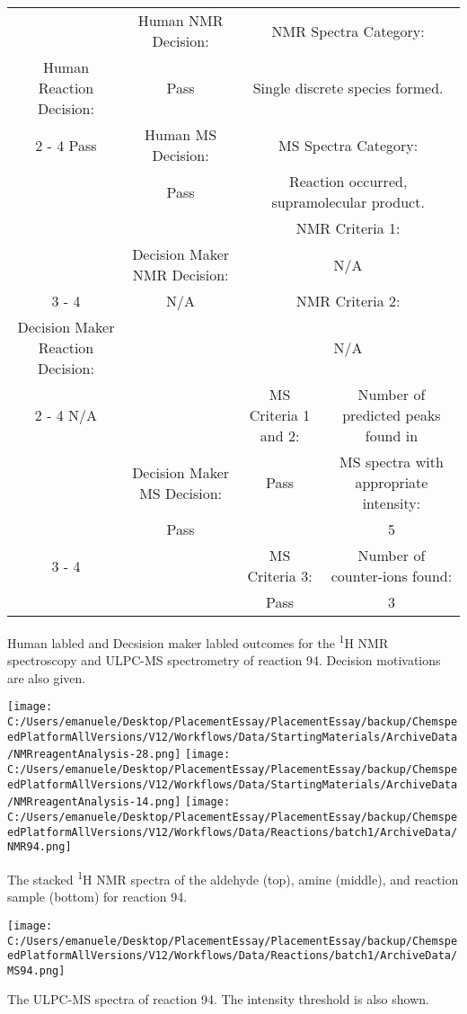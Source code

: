 \documentclass{article}%
\begin{document}
\begin{Decision Table}[H]%
\begin{tabular}{|c|c|c|c|}%
\hline%
&Human NMR Decision:&\multicolumn{2}{|c|}{NMR Spectra Category:}\\%
Human Reaction Decision:&Pass&\multicolumn{2}{|c|}{Single discrete species formed.}\\%
\cline{2%
-%
4}%
Pass&Human MS Decision:&\multicolumn{2}{|c|}{MS Spectra Category:}\\%
&Pass&\multicolumn{2}{|c|}{Reaction occurred, supramolecular product.}\\%
\hline%
&&\multicolumn{2}{|c|}{NMR Criteria 1:}\\%
&Decision Maker NMR Decision:&\multicolumn{2}{|c|}{N/A}\\%
\cline{3%
-%
4}%
&N/A&\multicolumn{2}{|c|}{NMR Criteria 2:}\\%
Decision Maker Reaction Decision:&&\multicolumn{2}{|c|}{N/A}\\%
\cline{2%
-%
4}%
N/A&&MS Criteria 1 and 2:&Number of predicted peaks found in\\%
&Decision Maker MS Decision:&Pass&MS spectra with appropriate intensity:\\%
&Pass&&5\\%
\cline{3%
-%
4}%
&&MS Criteria 3:&Number of counter{-}ions found:\\%
&&Pass&3\\%
\hline%
\end{tabular}%
\caption{Human labled and Decsision maker labled outcomes for the \textsuperscript{1}H NMR spectroscopy and ULPC-MS spectrometry of reaction 94. Decision motivations are also given.}%
\end{Decision Table}%
\begin{NMR Spectra}[H]%
\begin{center}%
\texttt{[image: C:/Users/emanuele/Desktop/PlacementEssay/PlacementEssay/backup/ChemspeedPlatformAllVersions/V12/Workflows/Data/StartingMaterials/ArchiveData/NMRreagentAnalysis-28.png]}\hfill%
\texttt{[image: C:/Users/emanuele/Desktop/PlacementEssay/PlacementEssay/backup/ChemspeedPlatformAllVersions/V12/Workflows/Data/StartingMaterials/ArchiveData/NMRreagentAnalysis-14.png]}\hfill%
\texttt{[image: C:/Users/emanuele/Desktop/PlacementEssay/PlacementEssay/backup/ChemspeedPlatformAllVersions/V12/Workflows/Data/Reactions/batch1/ArchiveData/NMR94.png]}\hfill%
\end{center}%
\caption{The stacked \textsuperscript{1}H NMR spectra of the aldehyde (top), amine (middle), and reaction sample (bottom) for reaction 94.}%
\end{NMR Spectra}%
\begin{MS Spectra}[H]%
\begin{center}%
\texttt{[image: C:/Users/emanuele/Desktop/PlacementEssay/PlacementEssay/backup/ChemspeedPlatformAllVersions/V12/Workflows/Data/Reactions/batch1/ArchiveData/MS94.png]}\hfill%
\end{center}%
\caption{The ULPC-MS spectra of reaction 94. The intensity threshold is also shown.}%
\end{MS Spectra}%
\end{document}
